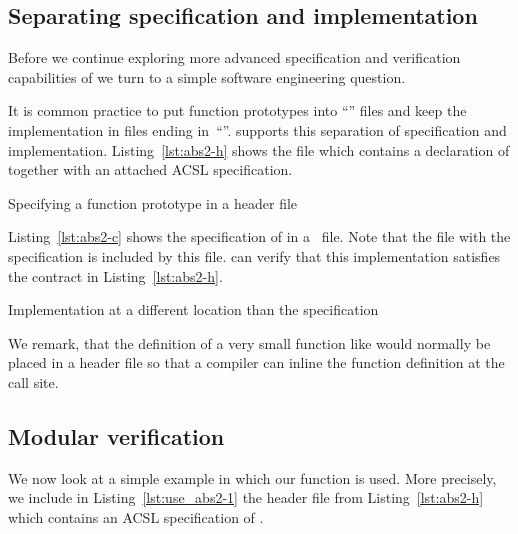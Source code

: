 \clearpage

\subsection{Separating specification and implementation}

Before we continue exploring more advanced specification and verification
capabilities of \framacwp we turn to a simple software engineering question.

It is common practice to put function prototypes into ``'' files and
keep the implementation in files ending in~``''.
\framacwp supports this separation of specification and implementation.
Listing~\ref{lst:abs2-h} shows the file  which contains
a declaration of  together with an attached ACSL specification.

\begin{listing}[hbt]
\begin{minipage}{\textwidth}

\end{minipage}
\caption{\label{lst:abs2-h} Specifying a function prototype in a header file}
\end{listing}

Listing~\ref{lst:abs2-c} shows the specification of  in a~ file.
Note that the file  with the specification is included by this file.
\framacwp can verify that this implementation satisfies the contract in
Listing~\ref{lst:abs2-h}.



\begin{listing}[hbt]
\begin{minipage}{\textwidth}

\end{minipage}
\caption{\label{lst:abs2-c} Implementation at a different location than the specification}
\end{listing}

We remark, that the definition of a very small function like  would normally
be placed in a header file so that a compiler can inline the function definition
at the call site.

\clearpage

\subsection{Modular verification}

We now look at a simple example in which our function  is used.
More precisely, we include in Listing~\ref{lst:use_abs2-1} the
header file from Listing~\ref{lst:abs2-h} which contains an ACSL specification of .

